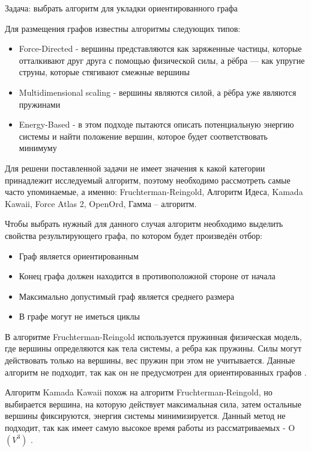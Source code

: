 \def\notedate{2022.11.29}
\def\currentauthor{Журавлев Н.В. (РК6-72Б)}
Задача: выбрать алгоритм для укладки ориентированного графа

Для размещения графов известны алгоритмы следующих типов\cite{alg-graph}:
\begin{itemize}
\item Force-Directed - вершины представляются как заряженные частицы, которые отталкивают друг друга с помощью физической силы, а рёбра — как упругие струны, которые стягивают смежные вершины
\item Multidimensional scaling - вершины являются силой, а рёбра уже являются пружинами
\item Energy-Based - в этом подходе пытаются описать потенциальную энергию системы и найти положение вершин, которое будет соответствовать минимуму
\end{itemize}

Для решени поставленной задачи не имеет значения к какой категории принадлежит исследуемый алгоритм, поэтому необходимо рассмотреть самые часто упоминаемые, а именно: Fruchterman-Reingold, Алгоритм Идеса, Kamada Kawaii, Force Atlas 2, OpenOrd, Гамма – алгоритм.

Чтобы выбрать нужный для данного случая алгоритм необходимо выделить свойства результирующего графа, по котором будет произведён отбор:
\begin{itemize}
\item Граф является ориентированным
\item Конец графа должен находится в противоположной стороне от начала
\item Максимально допустимый граф является среднего размера
\item В графе могут не иметься циклы
\end{itemize}

В алгоритме Fruchterman-Reingold используется пружинная физическая модель, где вершины определяются как тела системы, а ребра как пружины. Силы могут действовать только на вершины, вес пружин при этом не учитывается. Данные алгоритм не подходит, так как он не предусмотрен для ориентированных графов \cite{alg-fruchterman}.

Алгоритм Kamada Kawaii похож на алгоритм Fruchterman-Reingold, но выбирается вершина, на которую действует максимальная сила, затем остальные вершины фиксируются, энергия системы минимизируется. Данный метод не подходит, так как имеет самую высокое время работы из рассматриваемых - O$(V^3)$ \cite{alg-kamada-kawai}.

